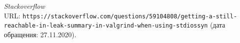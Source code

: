 \begin{thebibliography}{9}
    {\itshape Stackoverflow} \\URL: \texttt{https://stackoverflow.com/questions/59104808/getting-a-still-reachable-in-leak-summary-in-valgrind-when-using-stdiossyn} (дата обращения: 27.11.2020).
\end{thebibliography}
\pagebreak